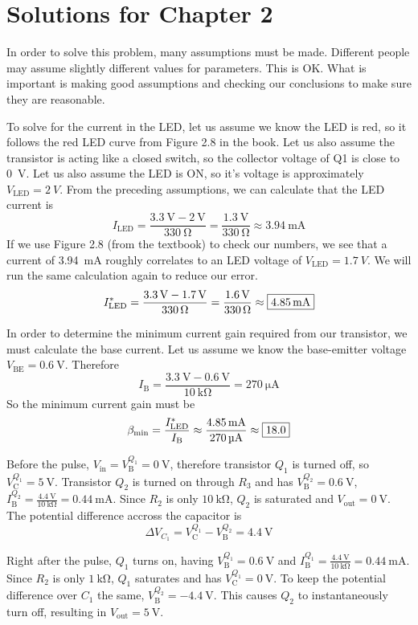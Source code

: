 \chapter{Solutions for Chapter 2}

In order to solve this problem, many assumptions must be made.
Different people may assume slightly different values for parameters.
This is OK.
What is important is making good assumptions and checking our conclusions to make sure they are reasonable.

To solve for the current in the LED, let us assume we know the LED is red, so it follows the red LED curve from Figure 2.8 in the book.
Let us also assume the transistor is acting like a closed switch, so the collector voltage of Q1 is close to \SI{0}{\V}.
Let us also assume the LED is ON, so it's voltage is approximately $V_\text{LED} = \SI{2}{V}$. From the preceding assumptions, we can calculate that the LED current is
\[I_\text{LED} = \frac{\SI{3.3}{\V} - \SI{2}{\V}}{\SI{330}{\ohm}} = \frac{\SI{1.3}{\V}}{\SI{330}{\ohm}} \approx \SI{3.94}{\mA}\]
If we use Figure 2.8 (from the textbook) to check our numbers, we see that a current of \SI{3.94}{\mA} roughly correlates to an LED voltage of $V_\text{LED} = \SI{1.7}{V}$.  We will run the same calculation again to reduce our error.
\[I^{*}_\text{LED} = \frac{\SI{3.3}{\V} - \SI{1.7}{\V}}{\SI{330}{\ohm}} = \frac{\SI{1.6}{\V}}{\SI{330}{\ohm}} \approx \mans{\SI{4.85}{\mA}}\]

In order to determine the minimum current gain required from our transistor, we must calculate the base current.
Let us assume we know the base-emitter voltage $V_\text{BE} = \SI{0.6}{\V}$.
Therefore
\[I_\text{B} = \frac{\SI{3.3}{\V} - \SI{0.6}{\V}}{\SI{10}{\kohm}} = \SI{270}{\uA}\]
So the minimum current gain must be
\[\beta_\text{min} = \frac{I^{*}_\text{LED}}{I_\text{B}} \approx \frac{\SI{4.85}{\mA}}{\SI{270}{\uA}} \approx \mans{18.0}\]

Before the pulse, $V_\text{in} = V^{Q_1}_\text{B} = \SI{0}{\V}$, therefore transistor $Q_1$ is turned off, so $V^{Q_1}_\text{C} = \SI{5}{\V}$.
Transistor $Q_2$ is turned on through $R_3$ and has $V^{Q_2}_\text{B} = \SI{0.6}{\V}$,
$I^{Q_2}_\text{B} = \frac{\SI{4.4}{\V}}{\SI{10}{\kohm}} = \SI{0.44}{\mA}$.
Since $R_2$ is only $\SI{10}{\kohm}$, $Q_2$ is saturated and $V_\text{out} = \SI{0}{\V}$.
The potential difference accross the capacitor is \[\Delta V_{C_1} = V^{Q_1}_\text{C} - V^{Q_2}_\text{B} = \SI{4.4}{\V}\]

Right after the pulse, $Q_1$ turns on, having $V^{Q_1}_\text{B} = \SI{0.6}{\V}$ and $I^{Q_1}_\text{B} = \frac{\SI{4.4}{\V}}{\SI{10}{\kohm}} = \SI{0.44}{\mA}$.
Since $R_2$ is only $\SI{1}{\kohm}$, $Q_1$ saturates and has $V^{Q_1}_\text{C} = \SI{0}{\V}$.
To keep the potential difference over $C_1$ the same, $V^{Q_2}_\text{B} = \SI{-4.4}{\V}$. This causes $Q_2$ to instantaneously turn off, resulting in $V_\text{out} = \SI{5}{\V}$.

